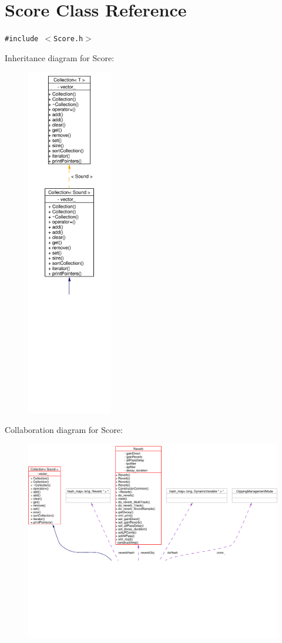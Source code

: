 \hypertarget{classScore}{
\section{Score Class Reference}
\label{classScore}
}
{\tt \#include $<$Score.h$>$}

Inheritance diagram for Score:\begin{figure}[H]
\begin{center}
\leavevmode
\includegraphics[width=105pt]{classScore__inherit__graph}
\end{center}
\end{figure}
Collaboration diagram for Score:\begin{figure}[H]
\begin{center}
\leavevmode
\includegraphics[width=420pt]{classScore__coll__graph}
\end{center}
\end{figure}
